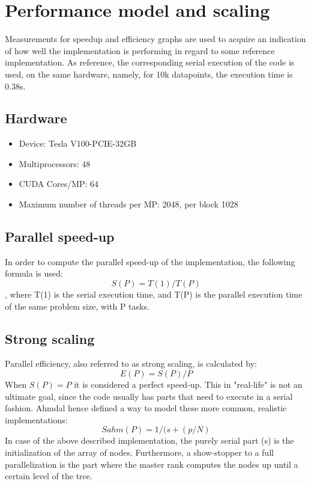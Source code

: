 \documentclass[11pt]{article}
\begin{document}
\section{Performance model and scaling}
Measurements for speedup and efficiency graphs are used to acquire an indication of how well the implementation is performing in regard to some reference
implementation. As reference, the corresponding serial execution of the code is used, on the same hardware, namely, for 10k datapoints, the execution time is 0.38s.
\subsection{Hardware}
\begin{itemize}
\item Device: Tesla V100-PCIE-32GB
\item Multiprocessors: 48
\item CUDA Cores/MP: 64
\item Maximum number of threads per MP: 2048, per block 1028
\end{itemize}
\subsection{Parallel speed-up}
In order to compute the parallel speed-up of the implementation, the following formula is used:
\begin{equation} \label{eqn}
	S(P) = {T(1) / T(P)} 
\end{equation}
, where T(1) is the serial execution time, and T(P) is the parallel execution time of the same problem size, with P tasks.
\subsection{Strong scaling}
Parallel efficiency, also referred to as strong scaling, is calculated by:
\begin{equation} \label{eqn}
	E(P) = {S(P) / P} 
\end{equation}
When $S(P)=P$ it is considered a perfect speed-up. This in "real-life" is not an ultimate goal, since the code usually has parts that need to execute in a serial fashion. Ahmdal hence defined a way to model these more common, realistic implementations:
\begin{equation} \label{eqn}
	Sahm(P) = {1 /(s + (p/N)} 
\end{equation}
In case of the above described implementation, the purely serial part (s) is the initialization of the array of nodes. Furthermore, a show-stopper to a full parallelization is the part where the master rank computes the nodes up until a certain level of the tree.
\end{document}
